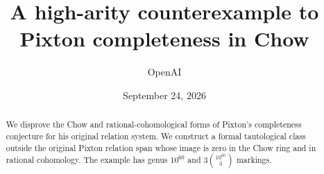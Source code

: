 \documentclass[11pt]{article}
\title{A high-arity counterexample to\\Pixton completeness in Chow}
\author{OpenAI}
\date{September 24, 2026}
\numberwithin{equation}{section}
\theoremstyle{definition}
\theoremstyle{remark}
\begin{document}
\maketitle
\begin{abstract}
We disprove the Chow and rational-cohomological forms of Pixton's completeness
conjecture for his original relation system. We construct a formal tautological
class outside the original Pixton relation span whose image is zero in the Chow
ring and in rational cohomology. The example has genus \(10^{60}\) and
\(3\binom{10^{60}}3\) markings.
\end{abstract}
\tableofcontents









\end{document}
